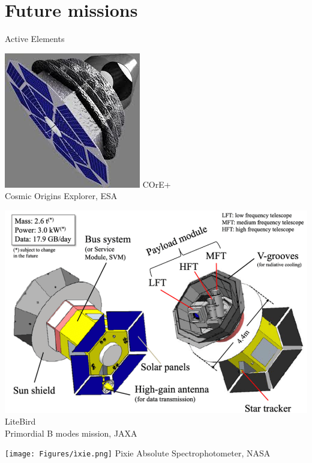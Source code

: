 \section{Future missions}
\begin{frame}{Active Elements}
\begin{minipage}{0.3\textwidth}
    \includegraphics[width=0.9\linewidth]{Figures/Core.jpg} 
    \small \centering  COrE+ \\ Cosmic Origins Explorer, ESA
\end{minipage}
\begin{minipage}{0.3\textwidth}
    \includegraphics[width=0.9\linewidth]{Figures/litebird.png} 
    \small \centering  LiteBird \\Primordial B modes mission, JAXA
\end{minipage}
\begin{minipage}{0.3\textwidth}
    \texttt{[image: Figures/ìxie.png]} 
    \small \centering  Pixie Absolute Spectrophotometer, NASA
\end{minipage}
\end{frame}

